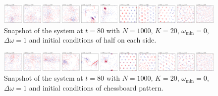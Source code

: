 \documentclass{article}
\begin{document}
\begin{figure}[H]
    \centering
    \includegraphics[width=\textwidth]{./figs/HalfInitPhaseLagPatternFormation_a0.00_Do1_aN1000_distuniform.pdf}
    \caption{
        \label{fig:half}
        Snapshot of the system at $t=80$ with $N=1000$, $K=20$, $\omega _{\min}=0$, $\Delta \omega=1$ and initial conditions of half on each side.
    }
\end{figure}

\begin{figure}[H]
    \centering
    \includegraphics[width=\textwidth]{./figs/ChessboardPhaseLagPatternFormation_a0.00_Do1_aN1000_distuniform.pdf}
    \caption{
        \label{fig:chess}
        Snapshot of the system at $t=80$ with $N=1000$, $K=20$, $\omega _{\min}=0$, $\Delta \omega=1$ and initial conditions of chessboard pattern.
    }
\end{figure}



\end{document}
